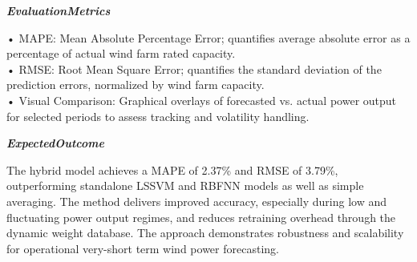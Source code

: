 \begin{tcolorbox}[
    breakable,
    title={Example of Idea Generation in Energy},
    colback=LighterGray,
    colframe=DeepPurple,
    colbacktitle=DeepPurple,
    coltitle=White,
]
\textbf{\emph{\textcolor{CaseOrange}{EvaluationMetrics}}}

• MAPE: Mean Absolute Percentage Error; quantifies average absolute error as a percentage of actual wind farm rated capacity. \\
• RMSE: Root Mean Square Error; quantifies the standard deviation of the prediction errors, normalized by wind farm capacity. \\
• Visual Comparison: Graphical overlays of forecasted vs. actual power output for selected periods to assess tracking and volatility handling. 

\textbf{\emph{\textcolor{CaseOrange}{ExpectedOutcome}}}

The hybrid model achieves a MAPE of 2.37\% and RMSE of 3.79\%, outperforming standalone LSSVM and
RBFNN models as well as simple averaging. The method delivers improved accuracy, especially during
low and fluctuating power output regimes, and reduces retraining overhead through the dynamic weight
database. The approach demonstrates robustness and scalability for operational very-short term wind
power forecasting.

\end{tcolorbox}



